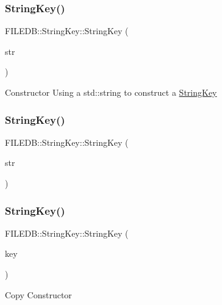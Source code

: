 \subsubsection{\texorpdfstring{StringKey()}{StringKey()}\hspace{0.1cm}{\footnotesize\ttfamily [10/12]}}
{\footnotesize\ttfamily F\+I\+L\+E\+D\+B\+::\+String\+Key\+::\+String\+Key (\begin{DoxyParamCaption}\item[{const std\+::string \&}]{str }\end{DoxyParamCaption})}

Constructor Using a std\+::string to construct a \mbox{\hyperlink{classFILEDB_1_1StringKey}{String\+Key}} \mbox{\label{classFILEDB_1_1StringKey_a7710b1f6cafd04e1e178d24019e81ae5}} 
\subsubsection{\texorpdfstring{StringKey()}{StringKey()}\hspace{0.1cm}{\footnotesize\ttfamily [11/12]}}
{\footnotesize\ttfamily F\+I\+L\+E\+D\+B\+::\+String\+Key\+::\+String\+Key (\begin{DoxyParamCaption}\item[{const char $\ast$}]{str }\end{DoxyParamCaption})}

\mbox{\label{classFILEDB_1_1StringKey_a042b0231e08bfbd9f9bc3802d95d0e9c}} 
\subsubsection{\texorpdfstring{StringKey()}{StringKey()}\hspace{0.1cm}{\footnotesize\ttfamily [12/12]}}
{\footnotesize\ttfamily F\+I\+L\+E\+D\+B\+::\+String\+Key\+::\+String\+Key (\begin{DoxyParamCaption}\item[{const \mbox{\hyperlink{classFILEDB_1_1StringKey}{String\+Key}} \&}]{key }\end{DoxyParamCaption})}

Copy Constructor \mbox{\label{classFILEDB_1_1StringKey_a45b2488c42cb895e30b927366ae96785}} 
